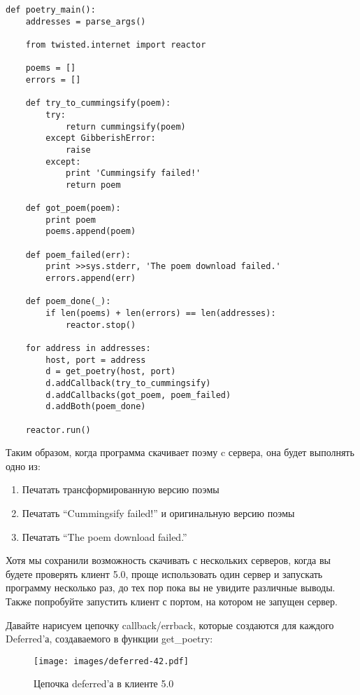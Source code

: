  \begin{verbatim}
def poetry_main():
    addresses = parse_args()

    from twisted.internet import reactor

    poems = []
    errors = []

    def try_to_cummingsify(poem):
        try:
            return cummingsify(poem)
        except GibberishError:
            raise
        except:
            print 'Cummingsify failed!'
            return poem

    def got_poem(poem):
        print poem
        poems.append(poem)

    def poem_failed(err):
        print >>sys.stderr, 'The poem download failed.'
        errors.append(err)

    def poem_done(_):
        if len(poems) + len(errors) == len(addresses):
            reactor.stop()

    for address in addresses:
        host, port = address
        d = get_poetry(host, port)
        d.addCallback(try_to_cummingsify)
        d.addCallbacks(got_poem, poem_failed)
        d.addBoth(poem_done)

    reactor.run()
\end{verbatim} 


Таким образом, когда программа скачивает поэму c сервера, она будет 
выполнять одно из:

\begin{enumerate}
\item Печатать трансформированную версию поэмы
\item Печатать “Cummingsify failed!” и оригинальную версию поэмы
\item Печатать “The poem download failed.” 
\end{enumerate}


Хотя мы сохранили возможность скачивать с нескольких серверов, 
когда вы будете проверять клиент 5.0, проще использовать один сервер и 
запускать программу несколько раз, до тех пор пока вы не увидите 
различные выводы. Также попробуйте запустить клиент с портом, на котором 
не запущен сервер.


Давайте нарисуем цепочку callback/errback, которые создаются для каждого 
Deferred'а, создаваемого в функции get\_poetry: 

\begin{figure}[h]
\begin{center}
    \texttt{[image: images/deferred-42.pdf]}
    \caption{Цепочка deferred'а в клиенте 5.0\label{fig:deferred-42}}
\end{center}
\end{figure}


